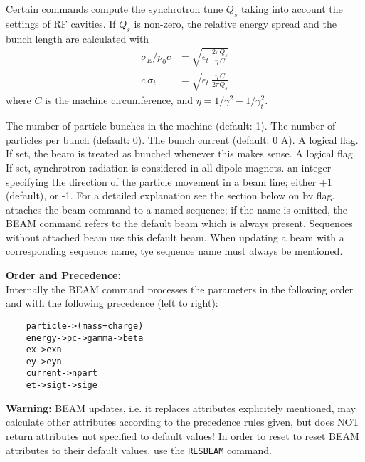 Certain commands compute the synchrotron tune $Q_s$ taking into account
the settings of RF cavities. 
If $Q_s$ is non-zero, the relative energy spread and 
the bunch length are calculated with
\begin{align*}
\sigma_E / p_0 c  &=  \sqrt{\epsilon_t\ \frac{2 \pi Q_s}{\eta\ C}} \\
  c\ \sigma_t &= \sqrt{\epsilon_t\ \frac{\eta\ C}{2 \pi Q_s}}
\end{align*}
where $C$ is the machine circumference, and 
$\eta = 1/\gamma^2 - 1/\gamma_t^2$.  
\\

\begin{madlist}
   The number of particle bunches in the
  machine (default: 1).  
   \label{beam_npart} The number of particles per bunch (default: 0). 
   The bunch current (default: 0 A). 
   A logical flag. If set, the beam is
  treated as bunched whenever this makes sense.  
   \label{beam_radiate} A logical flag. If set, synchrotron
  radiation is considered in all dipole magnets.  
   an integer specifying the direction of the
  particle movement in a beam line; either +1 (default), or -1. For a
  detailed explanation see the section below on bv flag.  
   attaches the beam command to a named sequence; if
  the name is omitted, the BEAM command refers to the default beam
  which is always present. Sequences without attached beam use this
  default beam. When updating a beam with a corresponding sequence name,
  tye sequence name must always be mentioned.    
\end{madlist} 

{\bf \underline{Order and Precedence:}}\\
Internally the BEAM command processes the parameters in the following
order and with the following precedence (left to right): 
\begin{verbatim}
    particle->(mass+charge)
    energy->pc->gamma->beta
    ex->exn
    ey->eyn
    current->npart
    et->sigt->sige
\end{verbatim} 


{\bf Warning:} BEAM updates, i.e. it replaces attributes explicitely
mentioned, may calculate other attributes according to the precedence rules
given, but does NOT return attributes not specified to default values! 
In order to reset to reset BEAM attributes to their default values, use
the {\tt RESBEAM} command.


